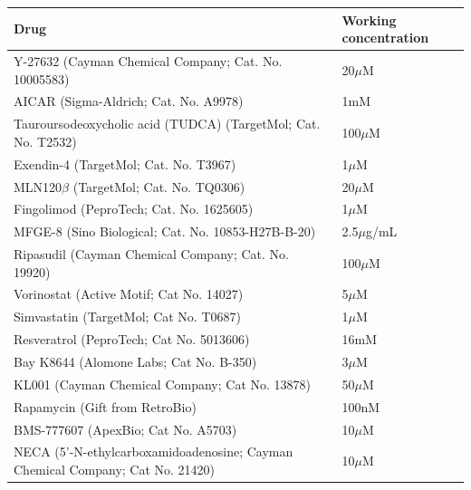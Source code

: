 \documentclass{article}
\begin{document}
\begin{table}[htbp]
\centering
\label{tab:drugs_concentrations}

\renewcommand{\arraystretch}{1.2} %

\begin{tabularx}{\columnwidth}{| >{\raggedright\arraybackslash}X | l |}
\hline
\textbf{Drug} & \textbf{Working concentration} \\
\hline

Y-27632 (Cayman Chemical Company; Cat. No. 10005583) & 20$\mu$M~\cite{sun_y-27632_2015} \\
\hline
AICAR (Sigma-Aldrich; Cat. No. A9978) & 1mM~\cite{chung_aicar_2017} \\
\hline
Tauroursodeoxycholic acid (TUDCA) (TargetMol; Cat. No. T2532) & 100$\mu$M~\cite{li_tudca_2019} \\
\hline
Exendin-4 (TargetMol; Cat. No. T3967) & 1$\mu$M~\cite{cui_exendin-4_2019} \\
\hline
MLN120$\beta$ (TargetMol; Cat. No. TQ0306) & 20$\mu$M~\cite{Hideshima_Neri_Tassone_Yasui_Ishitsuka_Raje_Chauhan_Podar_Mitsiades_Dang_et} \\
\hline
Fingolimod (PeproTech; Cat. No. 1625605) & 1$\mu$M~\cite{zhou_immunomodulatory_2009} \\
\hline
MFGE-8 (Sino Biological; Cat. No. 10853-H27B-B-20) & 2.5$\mu$g/mL~\cite{Chiang_Chen_Lin_Tsai_2008} \\
\hline
Ripasudil (Cayman Chemical Company; Cat. No. 19920) & 100$\mu$M~\cite{yang_ripasudil_2024} \\
\hline
Vorinostat (Active Motif; Cat No. 14027) & 5$\mu$M~\cite{maksimova_histone_2023} \\
\hline
Simvastatin (TargetMol; Cat No. T0687) & 1$\mu$M \\
\hline
Resveratrol (PeproTech; Cat No. 5013606) & 16mM~\cite{wagner_ascorbic_2011} \\
\hline
Bay K8644 (Alomone Labs; Cat No. B-350) & 3$\mu$M~\cite{lei_role_2008} \\
\hline
KL001 (Cayman Chemical Company; Cat No. 13878) & 50$\mu$M~\cite{hirota_identification_2012} \\
\hline
Rapamycin (Gift from RetroBio) & 100nM~\cite{semlali_rapamycin_2022} \\
\hline
BMS-777607 (ApexBio; Cat No. A5703) & 10$\mu$M~\cite{torka_activation_2014} \\
\hline
NECA (5’-N-ethylcarboxamidoadenosine; Cayman Chemical Company; Cat No. 21420) & 10$\mu$M~\cite{ohta_vitro_2009} \\

\end{tabularx}
\end{table}
\end{document}
